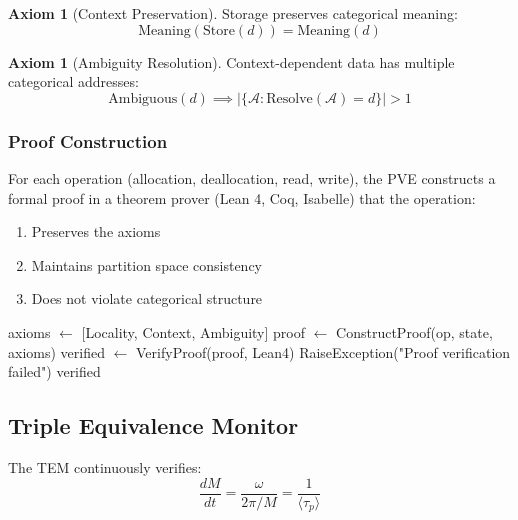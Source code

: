 \documentclass[twocolumn,10pt]{article}
\theoremstyle{definition}
\newtheorem{axiom}[theorem]{Axiom}
\theoremstyle{remark}
\newcommand{\cataddr}{\mathcal{A}}
\begin{document}
\begin{axiom}[Context Preservation]
Storage preserves categorical meaning:
\begin{equation}
    \text{Meaning}(\text{Store}(d)) = \text{Meaning}(d)
\end{equation}
\end{axiom}

\begin{axiom}[Ambiguity Resolution]
Context-dependent data has multiple categorical addresses:
\begin{equation}
    \text{Ambiguous}(d) \implies |\{\cataddr : \text{Resolve}(\cataddr) = d\}| > 1
\end{equation}
\end{axiom}

\subsubsection{Proof Construction}

For each operation (allocation, deallocation, read, write), the PVE constructs a formal proof in a theorem prover (Lean 4, Coq, Isabelle) that the operation:
\begin{enumerate}
    \item Preserves the axioms
    \item Maintains partition space consistency
    \item Does not violate categorical structure
\end{enumerate}

\begin{algorithm}
\caption{Proof Validation}
\begin{algorithmic}[1]
    \State axioms $\gets$ [Locality, Context, Ambiguity]
    \State proof $\gets$ ConstructProof(op, state, axioms)
    \State verified $\gets$ VerifyProof(proof, Lean4)
        \State RaiseException("Proof verification failed")
    \EndIf
    \State \Return verified
\EndFunction
\end{algorithmic}
\end{algorithm}

\subsection{Triple Equivalence Monitor}

The TEM continuously verifies:
\begin{equation}
    \frac{dM}{dt} = \frac{\omega}{2\pi/M} = \frac{1}{\langle \tau_p \rangle}
\end{equation}
\end{document}
